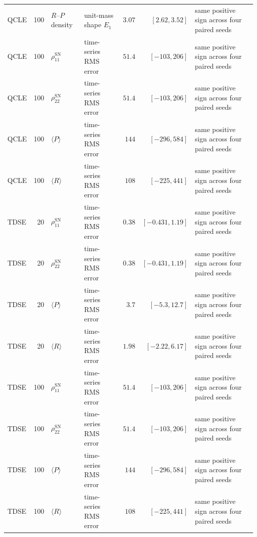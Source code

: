 \documentclass[
  11pt,
  letterpaper,
  onehalfspacing,
  normalmargins,
  equalmargins,
  oneside
]{ut-thesis}
\begin{document}
\begin{landscape}
\begin{longtable}{l r l l r r L{0.23\textwidth}}
QCLE & 100 & $R$--$P$ density & unit-mass shape $E_1$ & $3.07$ & $[2.62,3.52]$ & same positive sign across four paired seeds \\
QCLE & 100 & $\rho_{11}^{\mathrm{SN}}$ & time-series RMS error & $51.4$ & $[-103,206]$ & same positive sign across four paired seeds \\
QCLE & 100 & $\rho_{22}^{\mathrm{SN}}$ & time-series RMS error & $51.4$ & $[-103,206]$ & same positive sign across four paired seeds \\
QCLE & 100 & $\langle P\rangle$ & time-series RMS error & $144$ & $[-296,584]$ & same positive sign across four paired seeds \\
QCLE & 100 & $\langle R\rangle$ & time-series RMS error & $108$ & $[-225,441]$ & same positive sign across four paired seeds \\
TDSE & 20 & $\rho_{11}^{\mathrm{SN}}$ & time-series RMS error & $0.38$ & $[-0.431,1.19]$ & same positive sign across four paired seeds \\
TDSE & 20 & $\rho_{22}^{\mathrm{SN}}$ & time-series RMS error & $0.38$ & $[-0.431,1.19]$ & same positive sign across four paired seeds \\
TDSE & 20 & $\langle P\rangle$ & time-series RMS error & $3.7$ & $[-5.3,12.7]$ & same positive sign across four paired seeds \\
TDSE & 20 & $\langle R\rangle$ & time-series RMS error & $1.98$ & $[-2.22,6.17]$ & same positive sign across four paired seeds \\
TDSE & 100 & $\rho_{11}^{\mathrm{SN}}$ & time-series RMS error & $51.4$ & $[-103,206]$ & same positive sign across four paired seeds \\
TDSE & 100 & $\rho_{22}^{\mathrm{SN}}$ & time-series RMS error & $51.4$ & $[-103,206]$ & same positive sign across four paired seeds \\
TDSE & 100 & $\langle P\rangle$ & time-series RMS error & $144$ & $[-296,584]$ & same positive sign across four paired seeds \\
TDSE & 100 & $\langle R\rangle$ & time-series RMS error & $108$ & $[-225,441]$ & same positive sign across four paired seeds \\
\end{longtable}
\endgroup
\end{landscape}
\end{document}
